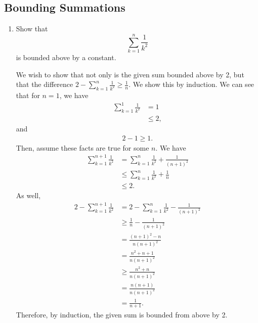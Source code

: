 \documentclass[AppendixA]{subfiles}
\begin{document}
	\subsection{Bounding Summations}

	\begin{enumerate}[leftmargin=\labelsep]
		\item Show that
		\[
			\sum_{k = 1}^n \frac{1}{k^2}
		\]
		is bounded above by a constant.
		\begin{answer}
			We wish to show that not only is the given sum bounded above by 2, but that the difference $2 - \sum_{k = 1}^n \frac{1}{k^2} \geq \frac{1}{n}$. We show this by induction. We can see that for $n = 1$, we have
			\begin{align*}
				\sum_{k = 1}^1 \frac{1}{k^2} &= 1\\
					&\leq 2,
			\end{align*}
			and
			\begin{align*}
				2 - 1 \geq 1.
			\end{align*}
			Then, assume these facts are true for some $n$. We have
			\begin{align*}
				\sum_{k = 1}^{n + 1} \frac{1}{k^2} &= \sum_{k = 1}^n \frac{1}{k^2} + \frac{1}{(n + 1)^2}\\
					&\leq \sum_{k = 1}^n \frac{1}{k^2} + \frac{1}{n}\\
					&\leq 2.
			\end{align*}
			As well,
			\begin{align*}
				2 - \sum_{k = 1}^{n + 1} \frac{1}{k^2} &= 2 - \sum_{k = 1}^n \frac{1}{k^2} - \frac{1}{(n + 1)^2}\\
					&\geq \frac{1}{n} - \frac{1}{(n + 1)^2}\\
					&= \frac{(n+1)^2 - n}{n(n + 1)^2}\\
					&= \frac{n^2 + n + 1}{n(n + 1)^2}\\
					&\geq \frac{n^2 + n}{n(n + 1)^2}\\
					&= \frac{n(n + 1)}{n(n + 1)^2}\\
					&= \frac{1}{n + 1}.
			\end{align*}
			Therefore, by induction, the given sum is bounded from above by 2.
		\end{answer}


\end{enumerate}
\end{document}
